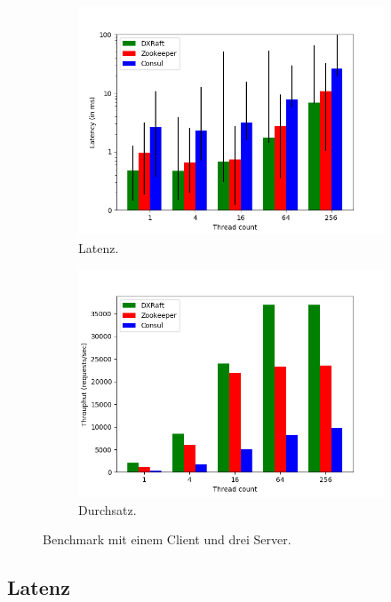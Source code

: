 \begin{figure}[t]
	\centering
	\begin{subfigure}[t]{0.45\textwidth}
		\includegraphics[width=\textwidth]{img/latency.png}
		\caption{Latenz.}
		\label{fig:latency}
	\end{subfigure}
	\begin{subfigure}[t]{0.45\textwidth}
		\includegraphics[width=\textwidth]{img/throughput.png}
		\caption{Durchsatz.}
		\label{fig:throughput}
	\end{subfigure}
	\caption{Benchmark mit einem Client und drei Server.}
\end{figure}

\subsection{Latenz}

